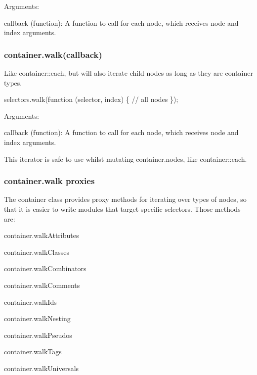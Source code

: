 Arguments\+:


\begin{DoxyItemize}
\item {\ttfamily callback (function)}\+: A function to call for each node, which receives {\ttfamily node} and {\ttfamily index} arguments.
\end{DoxyItemize}

\subsubsection*{{\ttfamily container.\+walk(callback)}}

Like {\ttfamily container\+::each}, but will also iterate child nodes as long as they are {\ttfamily container} types.


\begin{DoxyCode}
selectors.walk(function (selector, index) \{
    // all nodes
\});
\end{DoxyCode}


Arguments\+:


\begin{DoxyItemize}
\item {\ttfamily callback (function)}\+: A function to call for each node, which receives {\ttfamily node} and {\ttfamily index} arguments.
\end{DoxyItemize}

This iterator is safe to use whilst mutating {\ttfamily container.\+nodes}, like {\ttfamily container\+::each}.

\subsubsection*{{\ttfamily container.\+walk} proxies}

The container class provides proxy methods for iterating over types of nodes, so that it is easier to write modules that target specific selectors. Those methods are\+:


\begin{DoxyItemize}
\item {\ttfamily container.\+walk\+Attributes}
\item {\ttfamily container.\+walk\+Classes}
\item {\ttfamily container.\+walk\+Combinators}
\item {\ttfamily container.\+walk\+Comments}
\item {\ttfamily container.\+walk\+Ids}
\item {\ttfamily container.\+walk\+Nesting}
\item {\ttfamily container.\+walk\+Pseudos}
\item {\ttfamily container.\+walk\+Tags}
\item {\ttfamily container.\+walk\+Universals}
\end{DoxyItemize}

